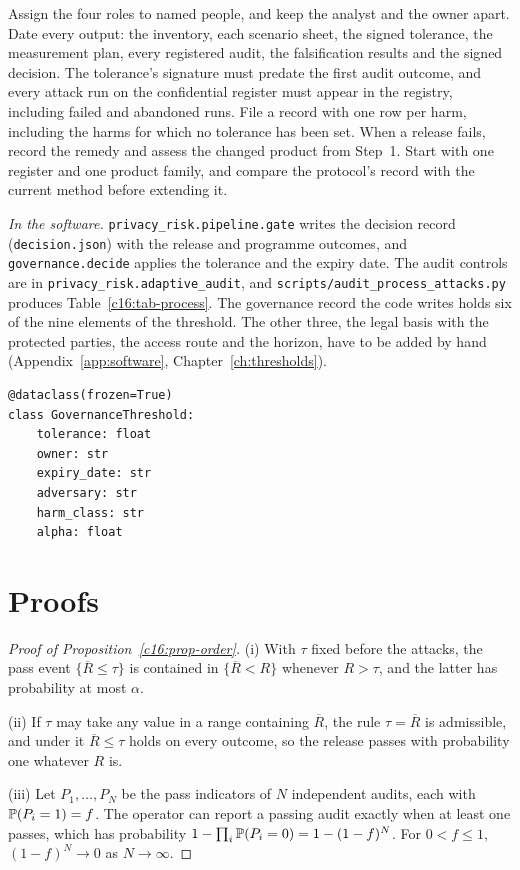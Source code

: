 \begin{inpractice}
\setlength{\emergencystretch}{3em}%
Assign the four roles to named people, and keep the analyst and the owner apart.
Date every output: the inventory, each scenario sheet, the signed tolerance, the
measurement plan, every registered audit, the falsification results and the signed
decision. The tolerance's signature must predate the first audit outcome, and every
attack run on the confidential register must appear in the registry, including
failed and abandoned runs. File a record with one row per harm, including the harms
for which no tolerance has been set. When a release fails, record the remedy and
assess the changed product from Step~1. Start with one register and one product
family, and compare the protocol's record with the current method before extending
it.

\smallskip\noindent\textit{In the software.} \texttt{privacy\_\allowbreak{}risk.\allowbreak{}pipeline.\allowbreak{}gate}
writes the decision record (\texttt{decision.\allowbreak{}json}) with the release and programme
outcomes, and \texttt{governance.\allowbreak{}decide} applies the tolerance and the expiry date.
The audit controls are in \texttt{privacy\_\allowbreak{}risk.\allowbreak{}adaptive\_\allowbreak{}audit}, and
\texttt{scripts/\allowbreak{}audit\_\allowbreak{}process\_\allowbreak{}attacks.\allowbreak{}py} produces Table~\ref{c16:tab-process}. The
governance record the code writes holds six of the nine elements of the threshold. The other three, the legal basis with
the protected parties, the access route and the horizon, have to be added by hand
(Appendix~\ref{app:software}, Chapter~\ref{ch:thresholds}).
\begin{lstlisting}
@dataclass(frozen=True)
class GovernanceThreshold:
    tolerance: float
    owner: str
    expiry_date: str
    adversary: str
    harm_class: str
    alpha: float
\end{lstlisting}
\end{inpractice}

\section{Proofs}

\begin{proof}[Proof of Proposition~\ref{c16:prop-order}]
(i) With $\tau$ fixed before the attacks, the pass event $\{\overline{R} \le \tau\}$ is
contained in $\{\overline{R} < R\}$ whenever $R > \tau$, and the latter has probability
at most $\alpha$.

(ii) If $\tau$ may take any value in a range containing $\overline{R}$, the rule
$\tau = \overline{R}$ is admissible, and under it $\overline{R} \le \tau$ holds on every
outcome, so the release passes with probability one whatever $R$ is.

(iii) Let $P_1,\dots,P_N$ be the pass indicators of $N$ independent audits, each with
$\mathbb{P}(P_i = 1) = f$. The operator can report a passing audit exactly when at least
one passes, which has probability $1 - \prod_i \mathbb{P}(P_i = 0) = 1 - (1-f)^N$. For
$0 < f \le 1$, $(1-f)^N \to 0$ as $N \to \infty$.
\end{proof}
